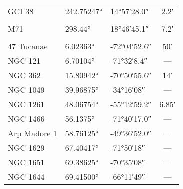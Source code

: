 \begin{table}[H]
\begin{tabular}[t]{l l l c}
        GCI 38                 & \ang[minimum-integer-digits=2]{242.75247} & \ang[minimum-integer-digits=2]{+14;57;28.0} & \ang{;2.2;}           \\
        \addlinespace[2em]
        \midrule[0.5pt]
        \multicolumn{4}{c}{Area 2}                                                                                                               \\
        \midrule[0.5pt]
        M71                    & \ang[minimum-integer-digits=2]{298.44}    & \ang[minimum-integer-digits=2]{+18;46;45.1} & \ang{;7.2;}           \\
        \addlinespace[2em]
        \midrule[0.5pt]
        \multicolumn{4}{c}{Area 3}                                                                                                               \\
        \midrule[0.5pt]
        47 Tucanae             & \ang[minimum-integer-digits=2]{6.02363}   & \ang[minimum-integer-digits=2]{-72;04;52.6} & \ang{;50;}            \\
        NGC 121                & \ang[minimum-integer-digits=2]{6.70104}   & \ang[minimum-integer-digits=2]{-71;32;8.4}  & ---                   \\
        NGC 362                & \ang[minimum-integer-digits=2]{15.80942}  & \ang[minimum-integer-digits=2]{-70;50;55.6} & \ang{;14;}            \\
        NGC 1049               & \ang[minimum-integer-digits=2]{39.96875}  & \ang[minimum-integer-digits=2]{-34;16;08}   & ---                   \\
        NGC 1261               & \ang[minimum-integer-digits=2]{48.06754}  & \ang[minimum-integer-digits=2]{-55;12;59.2} & \ang{;6.85;}          \\
        NGC 1466               & \ang[minimum-integer-digits=2]{56.1375}   & \ang[minimum-integer-digits=2]{-71;40;17.0} & ---                   \\
        Arp Madore 1           & \ang[minimum-integer-digits=2]{58.76125}  & \ang[minimum-integer-digits=2]{-49;36;52.0} & ---                   \\
        NGC 1629               & \ang[minimum-integer-digits=2]{67.40417}  & \ang[minimum-integer-digits=2]{-71;50;18}   & ---                   \\
        NGC 1651               & \ang[minimum-integer-digits=2]{69.38625}  & \ang[minimum-integer-digits=2]{-70;35;08}   & ---                   \\
        NGC 1644               & \ang[minimum-integer-digits=2]{69.41500}  & \ang[minimum-integer-digits=2]{-66;11;49}   & ---                   \\

\end{tabular}
\end{table}
